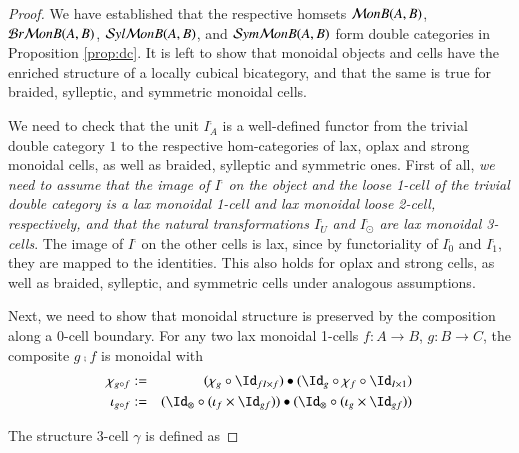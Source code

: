 \begin{proof}
We have established that the respective homsets $\mathcal{M} onB(A,B)$, $\mathcal{B} r \mathcal{M} onB(A,B)$, $\mathcal{S} yl \mathcal{M} onB(A,B)$, and $\mathcal{S} ym \mathcal{M} onB(A,B)$ form double categories in Proposition \ref{prop:dc}. It is left to show that monoidal objects and cells have the enriched structure of a locally cubical bicategory, and that the same is true for braided, sylleptic, and symmetric monoidal cells.

We need to check that the unit $I^{\comp}_A$ is a well-defined functor from the trivial double category $1$ to the respective hom-categories of lax, oplax and strong monoidal cells, as well as braided, sylleptic and symmetric ones. 
First of all, {\it we need to assume that the image of $I^{\comp}$ on the object and the loose 1-cell of the trivial double category is a lax monoidal 1-cell and lax monoidal loose 2-cell, respectively, and that the natural transformations $I^{\comp}_U$ and $I^{\comp}_{\odot}$ are lax monoidal 3-cells}. The image of $I^{\comp}$ on the other cells is lax, since by functoriality of $I^{\comp}_0$ and $I^{\comp}_1$, they are mapped to the identities. This also holds for oplax and strong cells, as well as braided, sylleptic, and symmetric cells under analogous assumptions. 

Next, we need to show that monoidal structure is preserved by the composition along a 0-cell boundary.
For any two lax monoidal 1-cells $f:A \rightarrow B$, $g:B \rightarrow C$, the composite $g \comp f$ is monoidal with 
\begin{align}
\chi_{g \comp f} &:= &(\chi_g \comp \looseid_{fI \times f}) \horc (\looseid_g \comp \chi_f \comp \looseid_{I \times \tightid}) \\
\iota_{g \comp f} & := & (\looseid_{\tens} \comp (\iota_f \times \looseid_{gf})) \horc (\looseid_{\tens} \comp (\iota_g \times \looseid_{gf}))
\end{align}

The structure 3-cell $\gamma$ is defined as


\end{proof}
